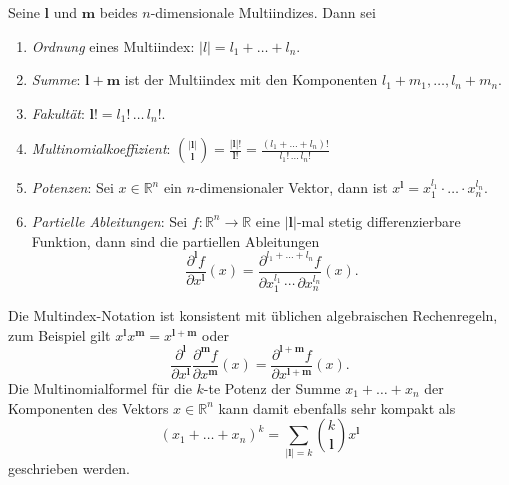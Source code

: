 \begin{definition}
Seine $\mathbf{l}$ und $\mathbf{m}$ beides $n$-dimensionale Multiindizes.
Dann sei
\begin{enumerate}
\item {\em Ordnung} eines Multiindex: $|l|=l_1+\dots+l_n$.
\item {\em Summe}: $\mathbf{l}+\mathbf{m}$ ist der Multiindex mit
den Komponenten $l_1+m_1,\dots,l_n+m_n$.
\item {\em Fakultät}: $\mathbf{l}! = l_1!\, \dots\, l_n!$.
\item {\em Multinomialkoeffizient}: $\displaystyle
\binom{|\mathbf{l}|}{\mathbf{l}}
=
\frac{|\mathbf{l}|!}{\mathbf{l}!}
=
\frac{(l_1+\dots+l_n)!}{l_1!\,\dots\,l_n!}
$
\item {\em Potenzen}: Sei $x\in\mathbb{R}^n$ ein $n$-dimensionaler Vektor,
dann ist $x^{\mathbf{l}} = x_1^{l_1}\cdot\ldots\cdot x_n^{l_n}$.
\item {\em Partielle Ableitungen}: Sei $f\colon\mathbb{R}^n\to\mathbb{R}$
eine $|\mathbf{l}|$-mal stetig differenzierbare Funktion, dann sind die
partiellen Ableitungen
\[
\frac{\partial^{\mathbf{l}} f}{\partial x^{\mathbf{l}}}(x)
=
\frac{\partial^{l_1+\dots+l_n} f}{\partial x_1^{l_1}\,\cdots\,\partial x_n^{l_n}}(x).
\]
\end{enumerate}
\end{definition}
Die Multindex-Notation ist konsistent mit üblichen algebraischen
Rechenregeln, zum Beispiel gilt
$x^{\mathbf{l}}x^{\mathbf{m}}=x^{\mathbf{l}+\mathbf{m}}$
oder 
\[
\frac{\partial^{\mathbf{l}}}{\partial x^{\mathbf{l}}}
\frac{\partial^{\mathbf{m}}f}{\partial x^{\mathbf{m}}}(x)
=
\frac{\partial^{\mathbf{l}+\mathbf{m}}f}{\partial x^{\mathbf{l}+\mathbf{m}}}(x).
\]
Die Multinomialformel für die $k$-te Potenz der Summe
$x_1+\dots+x_n$ der Komponenten des Vektors $x\in\mathbb{R}^n$
kann damit ebenfalls sehr kompakt als
\[
(x_1+\dots+x_n)^{k}
=
\sum_{|\mathbf{l}|=k}
\binom{k}{\mathbf{l}} x^{\mathbf{l}}
\]
geschrieben werden.

%
%
